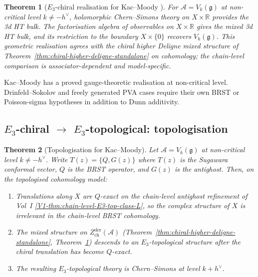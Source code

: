 \documentclass[11pt]{article}
\newtheorem{theorem}{Theorem}[section]
\theoremstyle{remark}
\providecommand{\cA}{\mathcal{A}}
\providecommand{\bR}{\mathbb{R}}
\providecommand{\fg}{\mathfrak{g}}
\begin{document}
\begin{theorem}[$E_3$-chiral realisation for Kac--Moody {\cite{CFG}}]%
\label{thm:e3-km}%
For $\cA = V_k(\fg)$ at non-critical level $k \ne -h^\vee$,
holomorphic Chern--Simons theory on $X \times \bR$ provides the
3d HT bulk.  The factorisation algebra of observables on
$X \times \bR$ gives the mixed 3d HT bulk, and its restriction to
the boundary $X \times \{0\}$ recovers $V_k(\fg)$. This geometric
realisation agrees with the chiral higher Deligne mixed structure of
Theorem~\ref{thm:chiral-higher-deligne-standalone} on cohomology; the
chain-level comparison is associator-dependent and model-specific.
\end{theorem}

Kac--Moody has a proved gauge-theoretic realisation at non-critical
level.  Drinfeld--Sokolov and freely generated PVA cases require their
own BRST or Poisson-sigma hypotheses in addition to Dunn additivity.

\subsection*{$E_3$-chiral $\to$ $E_3$-topological: topologisation}

\begin{theorem}[Topologisation for Kac--Moody]%
\label{thm:topologise}%
Let $\cA = V_k(\fg)$ at non-critical level $k \ne -h^\vee$.
Write $T(z) = \{Q, G(z)\}$ where $T(z)$ is the Sugawara conformal
vector, $Q$ is the BRST operator, and $G(z)$ is the antighost.
Then, on the topologised cohomology model:
\begin{enumerate}[label=\textup{(\alph*)}]
\item Translations along $X$ are $Q$-exact on the chain-level
  antighost refinement of Vol~I
  \ref*{V1-thm:chain-level-E3-top-class-L}, so the complex structure
  of $X$ is irrelevant in the chain-level BRST cohomology.
\item The mixed structure on
  $Z^{\mathrm{der}}_{\mathrm{ch}}(\cA)$
  (Theorem~\ref{thm:chiral-higher-deligne-standalone},
  Theorem~\ref{thm:e3-km}) descends to an
  $E_3$-topological structure after the chiral translation has become
  $Q$-exact.
\item The resulting $E_3$-topological theory is Chern--Simons at
  level $k + h^\vee$.
\end{enumerate}
\end{theorem}
\end{document}
